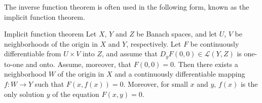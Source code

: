 The inverse function theorem is often used in the following form, known as the implicit function theorem.

\begin{Theorem}{Implicit function theorem}
\label{thm:banach-implicit-function}
Let $X$, $Y$ and $Z$ be Banach spaces, and let $U$, $V$ be neighborhoods of the origin in $X$ and $Y$, respectively. Let $F$ be continuously differentiable from $U\times V$ into $Z$, and assume that $D_yF(0,0)\in\mathcal{L}(Y,Z)$ is one-to-one and onto. Assume, moreover, that $F(0,0)=0$. Then there exists a neighborhood $W$ of the origin in $X$ and a continuously differentiable mapping $f:W\to Y$ such that $F(x,f(x))=0$. Moreover, for small $x$ and $y$, $f(x)$ is the only solution $y$ of the equation $F(x,y)=0$.
\end{Theorem}

\begingroup
\renewcommand{\endProof}{\par\nobreak\hfill$\blacksquare$\par\vspace{0.1cm}}
\endgroup

